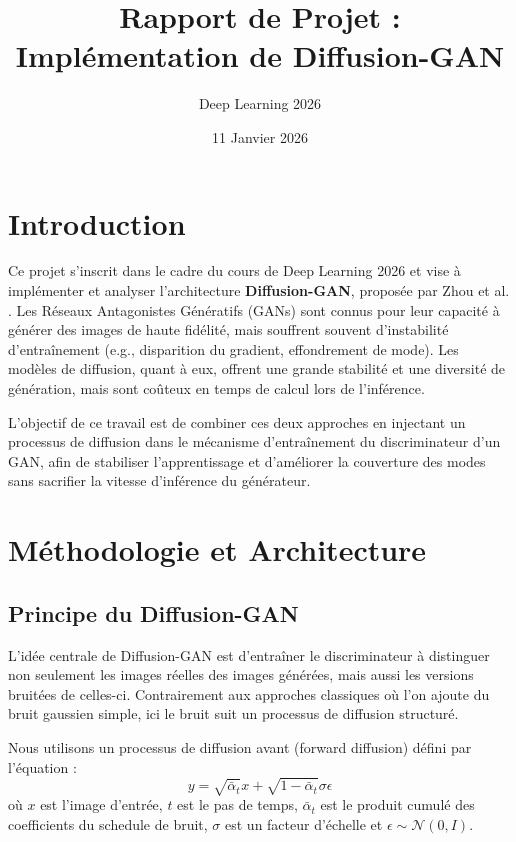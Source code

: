 \documentclass[a4paper,11pt]{article}
\title{\textbf{Rapport de Projet : Implémentation de Diffusion-GAN}}
\author{Deep Learning 2026}
\date{11 Janvier 2026}
\begin{document}
\maketitle

\section{Introduction}
Ce projet s'inscrit dans le cadre du cours de Deep Learning 2026 et vise à implémenter et analyser l'architecture \textbf{Diffusion-GAN}, proposée par Zhou et al. \cite{zhou2023training}. Les Réseaux Antagonistes Génératifs (GANs) sont connus pour leur capacité à générer des images de haute fidélité, mais souffrent souvent d'instabilité d'entraînement (e.g., disparition du gradient, effondrement de mode). Les modèles de diffusion, quant à eux, offrent une grande stabilité et une diversité de génération, mais sont coûteux en temps de calcul lors de l'inférence.

L'objectif de ce travail est de combiner ces deux approches en injectant un processus de diffusion dans le mécanisme d'entraînement du discriminateur d'un GAN, afin de stabiliser l'apprentissage et d'améliorer la couverture des modes sans sacrifier la vitesse d'inférence du générateur.

\section{Méthodologie et Architecture}

\subsection{Principe du Diffusion-GAN}
L'idée centrale de Diffusion-GAN est d'entraîner le discriminateur à distinguer non seulement les images réelles des images générées, mais aussi les versions bruitées de celles-ci. Contrairement aux approches classiques où l'on ajoute du bruit gaussien simple, ici le bruit suit un processus de diffusion structuré.

Nous utilisons un processus de diffusion avant (forward diffusion) défini par l'équation :
\begin{equation}
    y = \sqrt{\bar{\alpha}_t} x + \sqrt{1 - \bar{\alpha}_t} \sigma \epsilon
\end{equation}
où $x$ est l'image d'entrée, $t$ est le pas de temps, $\bar{\alpha}_t$ est le produit cumulé des coefficients du schedule de bruit, $\sigma$ est un facteur d'échelle et $\epsilon \sim \mathcal{N}(0, I)$.
\end{document}
